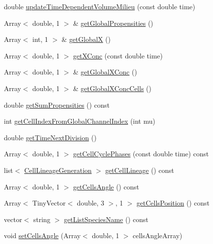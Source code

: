 \begin{DoxyCompactItemize}
\item 
double \hyperlink{class_cell_collection_a6b2c42ce840c375f1aa7711908c95494}{update\-Time\-Dependent\-Volume\-Milieu} (const double time)
\item 
\-Array$<$ double, 1 $>$ \& \hyperlink{class_cell_collection_a955d5ddfbedf013e30e6b525a7ddcfa1}{get\-Global\-Propensities} ()
\item 
\-Array$<$ int, 1 $>$ \& \hyperlink{class_cell_collection_a025a9257c4f04866076cfa34efcef753}{get\-Global\-X} ()
\item 
\-Array$<$ double, 1 $>$ \hyperlink{class_cell_collection_afd9e296d8bcec397103ce8e821e1f14f}{get\-X\-Conc} (const double time)
\item 
\-Array$<$ double, 1 $>$ \& \hyperlink{class_cell_collection_a78a1476ba1f6f5610f008f8e9a0e8885}{get\-Global\-X\-Conc} ()
\item 
\-Array$<$ double, 1 $>$ \& \hyperlink{class_cell_collection_a8b58a001e99379f9fbd9fb0c37d1994d}{get\-Global\-X\-Conc\-Cells} ()
\item 
double \hyperlink{class_cell_collection_a994fcfe5ce2b2bbf1095ef2e5d464919}{get\-Sum\-Propensities} () const 
\item 
int \hyperlink{class_cell_collection_a68908bf5abda3a9ccdfcf2091e806f24}{get\-Cell\-Index\-From\-Global\-Channel\-Index} (int mu)
\item 
double \hyperlink{class_cell_collection_a654fd71e9f104982f1453c5aafbc6fda}{get\-Time\-Next\-Division} ()
\item 
\-Array$<$ double, 1 $>$ \hyperlink{class_cell_collection_a8100eb42a76f3695e7a4aeabc6d13650}{get\-Cell\-Cycle\-Phases} (const double time) const 
\item 
list$<$ \hyperlink{class_cell_lineage_generation}{\-Cell\-Lineage\-Generation} $>$ \hyperlink{class_cell_collection_af142c6b0baeeeb2ec63a4c75d0170ad3}{get\-Cell\-Lineage} () const 
\item 
\-Array$<$ double, 1 $>$ \hyperlink{class_cell_collection_a09289829176cd533054d316240a53ebf}{get\-Cells\-Angle} () const 
\item 
\-Array$<$ \-Tiny\-Vector$<$ double, 3 $>$, 1 $>$ \hyperlink{class_cell_collection_a8b061e8cce11e2a5d04b0bc7e050dbf7}{get\-Cells\-Position} () const 
\item 
vector$<$ string $>$ \hyperlink{class_cell_collection_add9fd6b9bbc126e0e407dd16b0d6f9ba}{get\-List\-Species\-Name} () const 
\item 
void \hyperlink{class_cell_collection_a75dc07332a3f267bc702554e4aa4e6cd}{set\-Cells\-Angle} (\-Array$<$ double, 1 $>$ cells\-Angle\-Array)

\end{DoxyCompactItemize}
